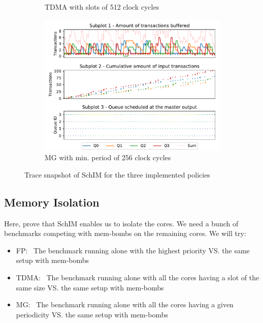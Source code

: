 \begin{figure}[!ht]
\begin{subfigure}{0.5\textwidth}
        \caption{TDMA with slots of 512 clock cycles}
        \label{fig:schim_behaviour_tdma}
      \end{subfigure}
      \vfill
      \begin{subfigure}{0.5\textwidth}
        \centering
        \includegraphics[scale=0.55]{images/SchIM_MG_buffering.pdf}
        \caption{MG with min. period of 256 clock cycles}
        \label{fig:schim_behaviour_mg}
      \end{subfigure}
      \caption{Trace snapshot of SchIM for the three implemented policies}
      \label{fig:schim_behaviour}
    \end{figure}

  \subsection{Memory Isolation}
    Here, prove that SchIM enables us to isolate the cores. We need a bunch of benchmarks competing with mem-bombs on the remaining cores. We will try:
    \begin{itemize}
      \item FP:~ The benchmark running alone with the highest priority VS. the same setup with mem-bombs
      \item TDMA:~ The benchmark running alone with all the cores having a slot of the same size VS. the same setup with mem-bombs
      \item MG:~ The benchmark running alone with all the cores having a given periodicity VS. the same setup with mem-bombs
    \end{itemize}
